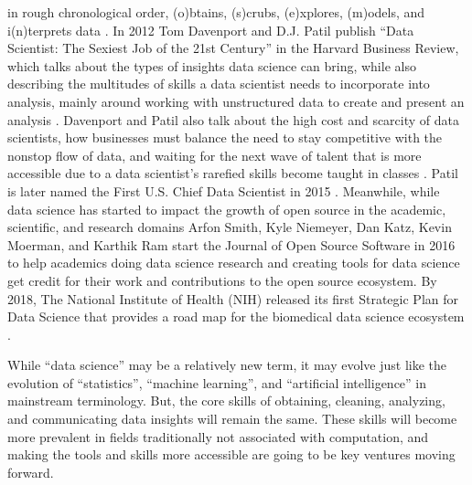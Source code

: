 \documentclass[010-intro.tex]{subfiles}
\begin{document}
    in rough chronological order,
    (o)btains, (s)crubs, (e)xplores, (m)odels, and i(n)terprets data
    \cite{masonTaxonomyDataScience2010}.
    In 2012 Tom Davenport and D.J. Patil publish
    ``Data Scientist: The Sexiest Job of the 21st Century''
    in the Harvard Business Review,
    which talks about the types of insights data science can bring,
    while also describing the multitudes of skills a data scientist needs to incorporate into analysis,
    mainly around working with unstructured data to create and present an analysis
    \cite{davenportDataScientistSexiest2012}.
    Davenport and Patil also talk about the high cost and scarcity of data scientists,
    how businesses must balance the need to stay competitive with the nonstop flow of data,
    and waiting for the next wave of talent that is more accessible
    due to a data scientist's rarefied skills become taught in classes
    \cite{davenportDataScientistSexiest2012}.
    Patil is later named the First U.S. Chief Data Scientist in 2015
    \cite{smithWhiteHouseNames2015}.
    Meanwhile, while data science has started to impact the growth of open source in the
    academic, scientific, and research domains
    \cite{tyagiHowFortune5002016, guszczaDataScienceOpen2015, kirschHowOpenSource2021}
    Arfon Smith, Kyle Niemeyer, Dan Katz, Kevin Moerman, and Karthik Ram start
    the Journal of Open Source Software in 2016 \cite{smithJournalOpenSource2018}
    to help academics doing data science research and creating tools for data science get
    credit for their work and contributions to the open source ecosystem.
    By 2018,
    The National Institute of Health (NIH) released its first Strategic Plan for Data Science
    that provides a road map for the biomedical data science ecosystem
    \cite{nationalinstitutesofhealthNIHStrategicPlan2020}.
    

    While ``data science'' may be a relatively new term,
    it may evolve just like the evolution of ``statistics'', ``machine learning'', and ``artificial intelligence''
    in mainstream terminology.
    But, the core skills of obtaining, cleaning, analyzing, and communicating data insights will remain the same.
    These skills will become more prevalent in fields traditionally not associated with computation,
    and making the tools and skills more accessible are going to be key ventures moving forward.
\end{document}
